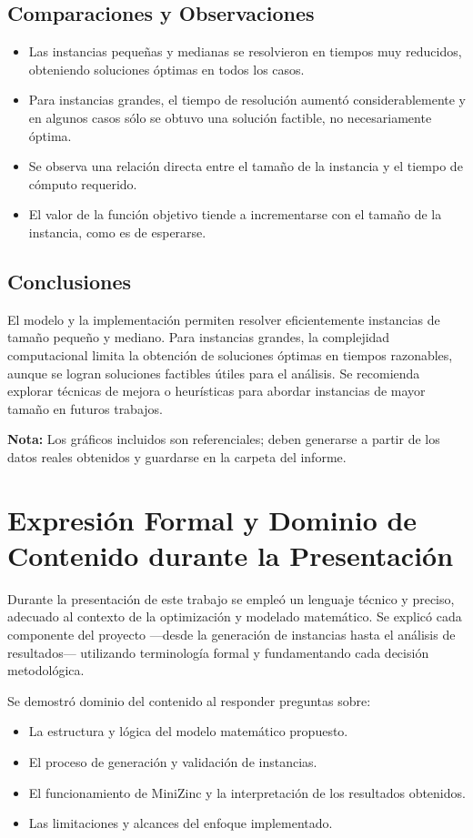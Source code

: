 \documentclass[a4paper,12pt]{article}
\begin{document}
\subsection{Comparaciones y Observaciones}
\begin{itemize}
    \item Las instancias pequeñas y medianas se resolvieron en tiempos muy reducidos, obteniendo soluciones óptimas en todos los casos.
    \item Para instancias grandes, el tiempo de resolución aumentó considerablemente y en algunos casos sólo se obtuvo una solución factible, no necesariamente óptima.
    \item Se observa una relación directa entre el tamaño de la instancia y el tiempo de cómputo requerido.
    \item El valor de la función objetivo tiende a incrementarse con el tamaño de la instancia, como es de esperarse.
\end{itemize}

\subsection{Conclusiones}
El modelo y la implementación permiten resolver eficientemente instancias de tamaño pequeño y mediano. Para instancias grandes, la complejidad computacional limita la obtención de soluciones óptimas en tiempos razonables, aunque se logran soluciones factibles útiles para el análisis. Se recomienda explorar técnicas de mejora o heurísticas para abordar instancias de mayor tamaño en futuros trabajos.

\textbf{Nota:} Los gráficos incluidos son referenciales; deben generarse a partir de los datos reales obtenidos y guardarse en la carpeta del informe.

\section{Expresión Formal y Dominio de Contenido durante la Presentación}
Durante la presentación de este trabajo se empleó un lenguaje técnico y preciso, adecuado al contexto de la optimización y modelado matemático. Se explicó cada componente del proyecto —desde la generación de instancias hasta el análisis de resultados— utilizando terminología formal y fundamentando cada decisión metodológica.

Se demostró dominio del contenido al responder preguntas sobre:
\begin{itemize}
    \item La estructura y lógica del modelo matemático propuesto.
    \item El proceso de generación y validación de instancias.
    \item El funcionamiento de MiniZinc y la interpretación de los resultados obtenidos.
    \item Las limitaciones y alcances del enfoque implementado.
\end{itemize}
\end{document}
